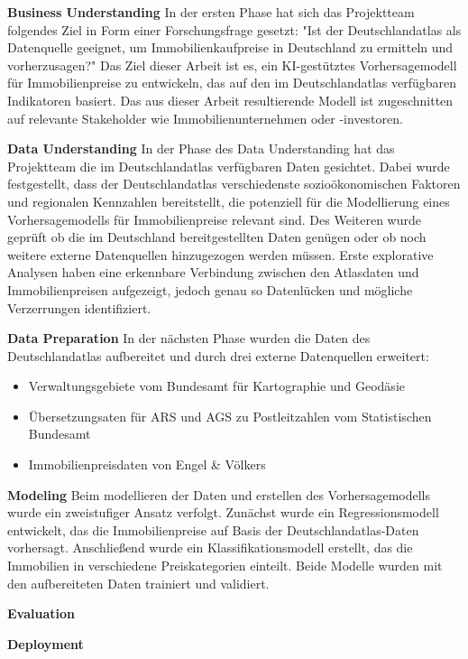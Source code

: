 \textbf{Business Understanding}
In der ersten Phase hat sich das Projektteam folgendes Ziel in Form einer Forschungsfrage gesetzt: "Ist der Deutschlandatlas als Datenquelle geeignet, um Immobilienkaufpreise in Deutschland zu ermitteln und vorherzusagen?"
Das Ziel dieser Arbeit ist es, ein KI-gestütztes Vorhersagemodell für Immobilienpreise zu entwickeln, das auf den im Deutschlandatlas verfügbaren Indikatoren basiert. Das aus dieser Arbeit resultierende Modell ist zugeschnitten auf relevante Stakeholder wie Immobilienunternehmen oder -investoren.

\textbf{Data Understanding}
In der Phase des Data Understanding hat das Projektteam die im Deutschlandatlas verfügbaren Daten gesichtet. Dabei wurde festgestellt, dass der Deutschlandatlas verschiedenste sozioökonomischen Faktoren und regionalen Kennzahlen bereitstellt, die potenziell für die Modellierung eines Vorhersagemodells für Immobilienpreise relevant sind. Des Weiteren wurde geprüft ob die im Deutschland bereitgestellten Daten genügen oder ob noch weitere externe Datenquellen hinzugezogen werden müssen. Erste explorative Analysen haben eine erkennbare Verbindung zwischen den Atlasdaten und Immobilienpreisen aufgezeigt, jedoch genau so Datenlücken und mögliche Verzerrungen identifiziert.

\textbf{Data Preparation}
In der nächsten Phase wurden die Daten des Deutschlandatlas aufbereitet und durch drei externe Datenquellen erweitert:
\begin{itemize}
    \item Verwaltungsgebiete vom Bundesamt für Kartographie und Geodäsie
    \item Übersetzungsaten für ARS und AGS zu Postleitzahlen vom Statistischen Bundesamt
    \item Immobilienpreisdaten von Engel & Völkers
\end{itemize}


\textbf{Modeling}
Beim modellieren der Daten und erstellen des Vorhersagemodells wurde ein zweistufiger Ansatz verfolgt. Zunächst wurde ein Regressionsmodell entwickelt, das die Immobilienpreise auf Basis der Deutschlandatlas-Daten vorhersagt. Anschließend wurde ein Klassifikationsmodell erstellt, das die Immobilien in verschiedene Preiskategorien einteilt. Beide Modelle wurden mit den aufbereiteten Daten trainiert und validiert.

\textbf{Evaluation}

\textbf{Deployment}



